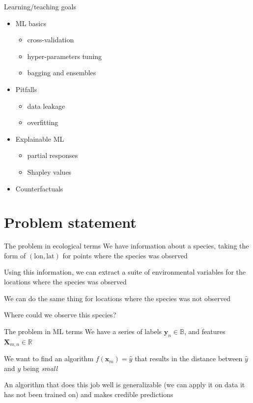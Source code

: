 \documentclass[12pt, smalloffset, compress, aspectratio=1610]{beamer}
\providecommand{\tightlist}{%
  \setlength{\itemsep}{0pt}\setlength{\parskip}{0pt}}
\begin{document}
\begin{frame}{Learning/teaching goals}
\label{learningteaching-goals}
\begin{itemize}
\tightlist
\item
  ML basics

  \begin{itemize}
  \tightlist
  \item
    cross-validation
  \item
    hyper-parameters tuning
  \item
    bagging and ensembles
  \end{itemize}
\item
  Pitfalls

  \begin{itemize}
  \tightlist
  \item
    data leakage
  \item
    overfitting
  \end{itemize}
\item
  Explainable ML

  \begin{itemize}
  \tightlist
  \item
    partial responses
  \item
    Shapley values
  \end{itemize}
\item
  Counterfactuals
\end{itemize}
\end{frame}

\section{Problem statement}\label{problem-statement}

\begin{frame}{The problem in ecological terms}
\label{the-problem-in-ecological-terms}
We have information about a species, taking the form of
\((\text{lon}, \text{lat})\) for points where the species was observed

Using this information, we can extract a suite of environmental
variables for the locations where the species was observed

We can do the same thing for locations where the species was not
observed

\alert{Where could we observe this species}?
\end{frame}

\begin{frame}{The problem in ML terms}
\label{the-problem-in-ml-terms}
We have a series of labels \(\mathbf{y}_n \in \mathbb{B}\), and features
\(\mathbf{X}_{m,n} \in \mathbb{R}\)

We want to find an algorithm \(f(\mathbf{x}_m) = \hat y\) that results
in the distance between \(\hat y\) and \(y\) being \emph{small}

An algorithm that does this job well is generalizable (we can apply it
on data it has not been trained on) and makes credible predictions
\end{frame}
\end{document}
